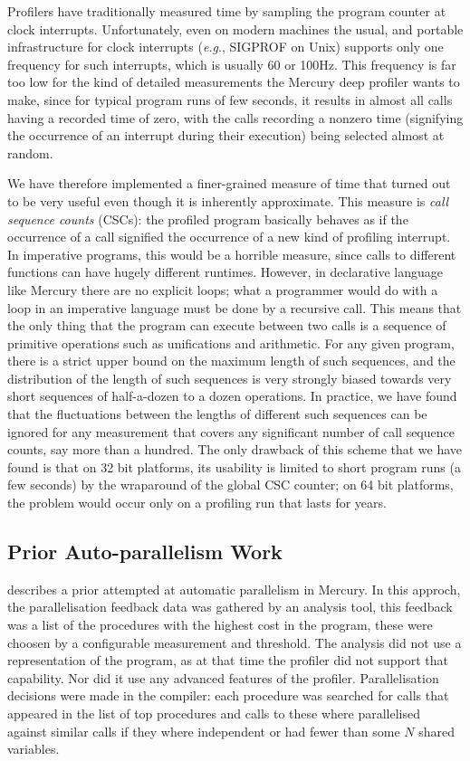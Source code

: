 Profilers have traditionally measured time
by sampling the program counter at clock interrupts.
Unfortunately, even on modern machines
the usual, and portable infrastructure for clock interrupts
(\emph{e.g}., SIGPROF on Unix)
supports only one frequency for such interrupts,
which is usually 60 or 100Hz.
This frequency is far too low for the kind of detailed measurements
the Mercury deep profiler wants to make,
since for typical program runs of few seconds,
it results in almost all calls having a recorded time of zero,
with the calls recording a nonzero time
(signifying the occurrence of an interrupt during their execution)
being selected almost at random.

We have therefore implemented a finer-grained measure of time
that turned out to be very useful
even though it is inherently approximate.
This measure is \emph{call sequence counts} (CSCs):
the profiled program basically behaves
as if the occurrence of a call signified
the occurrence of a new kind of profiling interrupt.
In imperative programs, this would be a horrible measure,
since calls to different functions can have hugely different runtimes.
However, in declarative language like Mercury there are no explicit loops;
what a programmer would do with a loop in an imperative language
must be done by a recursive call.
This means that the only thing that the program can execute between two calls
is a sequence of primitive operations such as unifications and arithmetic.
For any given program,
there is a strict upper bound on the maximum length of such sequences,
and the distribution of the length of such sequences
is very strongly biased towards very short sequences
of half-a-dozen to a dozen operations.
In practice, we have found that
the fluctuations between the lengths of different such sequences
can be ignored for any measurement
that covers any significant number of call sequence counts,
say more than a hundred.
The only drawback of this scheme that we have found
is that on 32 bit platforms,
its usability is limited to short program runs (a few seconds)
by the wraparound of the global CSC counter;
on 64 bit platforms, the problem would occur
only on a profiling run that lasts for years.

\subsection{Prior Auto-parallelism Work}

\citet{tannier:2007:parallel_mercury} describes a prior attempted at automatic
parallelism in Mercury.
In this approch, the parallelisation feedback data was gathered by an analysis
tool,
this feedback was a list of the procedures with the highest cost in the program,
these were choosen by a configurable measurement and threshold.
The analysis did not use a representation of the program,
as at that time the profiler did not support that capability.
Nor did it use any advanced features of the profiler.
Parallelisation decisions were made in the compiler:
each procedure was searched for calls that appeared in the list of top procedures
and calls to these where parallelised against similar calls if they
where independent or had fewer than some $N$ shared variables.

